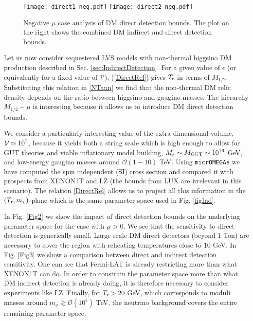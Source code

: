 \documentclass[11pt,a4paper]{article}
\newcommand{\mc}{\mathcal}
\newcommand{\V}{{\cal{V}}}
\begin{document}
\begin{figure}[!t]
\centering
\hspace{-0.5cm}
\texttt{[image: direct1\_neg.pdf]}
\hspace{-0.1cm}
\texttt{[image: direct2\_neg.pdf]}
\hspace{-0.5cm}
\caption{Negative $\mu$ case analysis of DM direct detection bounds. The plot on the right shows the combined DM indirect and direct detection bounds.}
\label{Fig4}
\end{figure}

Let us now consider sequestered LVS models with non-thermal higgsino DM production described in Sec. \ref{sec:IndirectDetection}. For a given value of $\epsilon$ (or equivalently for a fixed value of $\mc{V}$), (\ref{DirectRel}) gives $T_{\rm r}$ in terms of $M_{1/2}$. Substituting this relation in \eqref{NTann} we find that the non-thermal DM relic density depends on the ratio between higgsino and gaugino masses. The hierarchy $M_{1/2}-\mu$ is interesting because it allows us to introduce DM direct detection bounds. 

We consider a particularly interesting value of the extra-dimensional volume, $\V \simeq 10^7$, because it yields both a string scale which is high enough to allow for GUT theories and viable inflationary model building, $M_s \sim M_{\rm GUT} \sim 10^{16}$ GeV, and low-energy gaugino masses around $\mc{O}(1-10)$ TeV. Using \texttt{micrOMEGAs} we have computed the spin independent (SI) cross section and compared it with prospects from XENON1T \cite{Aprile:2011zza} and LZ \cite{Malling:2011va} (the bounds from LUX are irrelevant in this scenario). The relation \eqref{DirectRel} allows us to project all this information in the $(T_{\rm r}, m_\chi)$-plane which is the same parameter space used in Fig. \ref{figInd}.

In Fig. \ref{Fig2} we show the impact of direct detection bounds on the underlying parameter space for the case with $\mu > 0$. We see that the sensitivity to direct detection is generically small. Large scale DM direct detectors (beyond $1$ Ton) are necessary to cover the region with reheating temperatures close to $10$ GeV. In Fig. \ref{Fig3} we show a comparison between direct and indirect detection sensitivity. One can see that Fermi-LAT is already restricting more than what XENON1T can do. In order to constrain the parameter space more than what DM indirect detection is already doing, it is therefore necessary to consider experiments like LZ. Finally, for $T_{\rm r}>20$ GeV, which corresponds to moduli masses around $m_\phi\gtrsim \mc{O}(10^4)$ TeV, the neutrino background covers the entire remaining parameter space.
\end{document}
